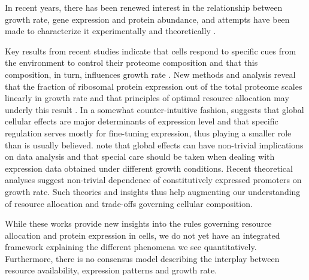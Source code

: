 \documentclass[a4page,notitlepage]{article}
\begin{document}
In recent years, there has been renewed interest in the relationship between growth rate, gene expression and protein abundance, and attempts have been made to characterize it experimentally \parencite{Zaslaver2009a, Levy2009, Berthoumieux2013} and theoretically \parencite{Klumpp2009a, Scott2010b}.

Key results from recent studies indicate that cells respond to specific cues from the environment to control their proteome composition and that this composition, in turn, influences growth rate \parencite{Levy2009}.
New methods and analysis reveal that the fraction of ribosomal protein expression out of the total proteome scales linearly in growth rate and that principles of optimal resource allocation may underly this result \parencite{Zaslaver2009a}.
In a somewhat counter-intuitive fashion, \parencite{Berthoumieux2013} suggests that global cellular effects are major determinants of expression level and that specific regulation serves mostly for fine-tuning expression, thus playing a smaller role than is usually believed.
\parencite{loven2012} note that global effects can have non-trivial implications on data analysis and that special care should be taken when dealing with expression data obtained under different growth conditions.
Recent theoretical analyses \parencite{Klumpp2009a,Scott2010b} suggest non-trivial dependence of constitutively expressed promoters on growth rate.
Such theories and insights thus help augmenting our understanding of resource allocation and trade-offs governing cellular composition.

While these works provide new insights into the rules governing resource allocation and protein expression in cells, we do not yet have an integrated framework explaining the different phenomena we see quantitatively.
Furthermore, there is no consensus model describing the interplay between resource availability, expression patterns and growth rate.
\end{document}

